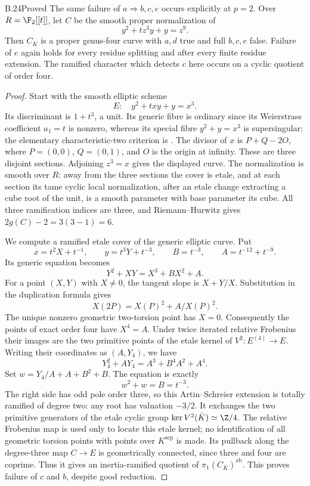 \begin{claim}{B.24}{Proved}
The same failure of $a\Rightarrow b,c,e$ occurs explicitly at $p=2$.
Over $R=\F_2[[t]]$, let $C$ be the smooth proper normalization of
\[
                    y^2+t z^3y+y=z^9.
\]
Then $C_K$ is a proper genus-four curve with $a,d$ true and full
$b,c,e$ false. Failure of $e$ again holds for every residue splitting
and after every finite residue extension. The ramified character which
detects $c$ here occurs on a cyclic quotient of order four.
\end{claim}
\begin{proof}
Start with the smooth elliptic scheme
\[
 E:\quad y^2+txy+y=x^3.
\]
Its discriminant is $1+t^3$, a unit. Its generic fibre is ordinary
since its Weierstrass coefficient $a_1=t$ is nonzero, whereas its special
fibre $y^2+y=x^3$ is supersingular; the elementary characteristic-two
criterion is \citet[Example 5.26]{BC_MoonenIsogs}.
The divisor of $x$ is $P+Q-2O$, where $P=(0,0)$, $Q=(0,1)$,
and $O$ is the origin at infinity. These are three disjoint sections.
Adjoining $z^3=x$ gives the displayed curve. The normalization is smooth
over $R$: away from the three sections the cover is etale, and at each
section its tame cyclic local normalization, after an etale change
extracting a cube root of the unit, is a smooth parameter with base
parameter its cube. All three ramification indices are three, and
Riemann--Hurwitz gives $2g(C)-2=3(3-1)=6$.

We compute a ramified etale cover of the generic elliptic curve. Put
\[
 x=t^2X+t^{-1},\qquad y=t^3Y+t^{-3},\qquad
 B=t^{-3},\qquad A=t^{-12}+t^{-9}.
\]
Its generic equation becomes
\[
                 Y^2+XY=X^3+BX^2+A.                         \tag{B.24.1}
\]
For a point $(X,Y)$ with $X\ne0$, the tangent slope is
$X+Y/X$. Substitution in the duplication formula gives
\[
                  X(2P)=X(P)^2+A/X(P)^2.
\]
The unique nonzero geometric two-torsion point has $X=0$.
Consequently the points of exact order four have $X^4=A$.
Under twice iterated relative Frobenius their images are the two
primitive points of the etale kernel of
$V^2:E^{(4)}\to E$. Writing their coordinates as $(A,Y_4)$, we have
\[
 Y_4^2+AY_4=A^3+B^4A^2+A^4.
\]
Set $w=Y_4/A+A+B^2+B$. The equation is exactly
\[
                       w^2+w=B=t^{-3}.                       \tag{B.24.2}
\]
The right side has odd pole order three, so this Artin--Schreier
extension is totally ramified of degree two: any root has valuation
$-3/2$. It exchanges the two primitive generators of the etale cyclic
group $\ker V^2(\bar K)\simeq\Z/4$. The relative Frobenius map is
used only to locate this etale kernel; no identification of all
geometric torsion points with points over $K^{\mathrm{sep}}$ is made.
Its pullback along the degree-three map $C\to E$ is geometrically
connected, since three and four are coprime. Thus it gives an
inertia-ramified quotient of $\pi_1(C_{\bar K})^{\mathrm{ab}}$.
This proves failure of $c$ and $b$, despite good reduction.


\end{proof}
